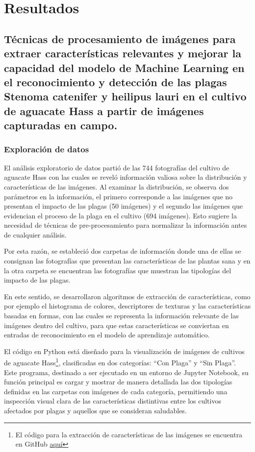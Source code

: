 \section{Resultados}

\subsection{Técnicas de procesamiento de imágenes para extraer características relevantes y mejorar la capacidad del modelo de Machine Learning en el reconocimiento y detección de las plagas Stenoma catenifer y heilipus lauri en el cultivo de aguacate Hass a partir de imágenes capturadas en campo.}

\subsubsection{Exploración de datos}

El análisis exploratorio de datos partió de las 744 fotografías del cultivo de aguacate Hass con las cuales se reveló información valiosa sobre la distribución y características de las imágenes. Al examinar la distribución, se observa dos parámetros en la información, el primero corresponde a las imágenes que no presentan el impacto de las plagas (50 imágenes) y el segundo las imágenes que evidencian el proceso de la plaga en el cultivo (694 imágenes). Esto sugiere la necesidad de técnicas de pre-procesamiento para normalizar la información antes de cualquier análisis.

Por esta razón, se estableció dos carpetas de información donde una de ellas se consignan las fotografías que presentan las características de las plantas sana y en la otra carpeta se encuentran las fotografías que muestran las tipologías del impacto de las plagas.

En este sentido, se desarrollaron algoritmos de extracción de características, como por ejemplo el histograma de colores, descriptores de texturas y las características basadas en formas, con las cuales se representa la información relevante de las imágenes dentro del cultivo, para que estas características se conviertan en entradas de reconocimiento en el modelo de aprendizaje automático.

El código en Python está diseñado para la visualización de imágenes de cultivos de aguacate Hass\footnote{El código para la extracción de características de las imágenes se encuentra en GitHub \href{https://github.com/juferoto/mlops_project/blob/master/notebooks/analisisExploratorio.ipynb}{aquí}}, clasificadas en dos categorías: ``Con Plaga'' y ``Sin Plaga''. Este programa, destinado a ser ejecutado en un entorno de Jupyter Notebook, su función principal es cargar y mostrar de manera detallada las dos tipologías definidas en las carpetas con imágenes de cada categoría, permitiendo una inspección visual clara de las características distintivas entre los cultivos afectados por plagas y aquellos que se consideran saludables.

